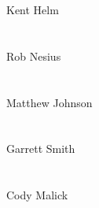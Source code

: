 \documentclass[10pt,letterpaper,onecolumn,draftclsnofoot]{IEEEtran}
\begin{document}
\noindent Kent Helm\hspace{0.7cm} \makebox[1.5in]{\hrulefill}\\\\\\
Rob Nesius\hspace{0.7cm} \makebox[1.5in]{\hrulefill}\\\\\\
Matthew Johnson\hspace{0.3cm} \makebox[1.5in]{\hrulefill}\\\\\\
Garrett Smith\hspace{0.7cm} \makebox[1.5in]{\hrulefill}\\\\\\
Cody Malick\hspace{0.7cm} \makebox[1.5in]{\hrulefill}\\\\\\
\end{document}
